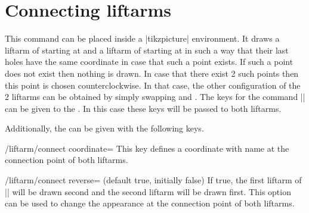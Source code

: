 \documentclass[a4paper,english,dvipsnames]{ltxdoc}
\begin{document}
\section{Connecting liftarms}
\begin{command}{\liftarmconnect{}}
This command can be placed inside a |tikzpicture| environment. It draws a liftarm of  starting at  and a liftarm of  starting at  in such a way that their last holes have the same coordinate in case that such a point exists. If such a point does not exist then nothing is drawn. In case that there exist 2 such points then this point is chosen counterclockwise. In that case, the other configuration of the 2 liftarms can be obtained by simply swapping  and . The keys for the command |\liftarm| can be given to the . In this case these keys will be passed to both liftarms.
\begin{codeexample}[width=9cm]
\end{codeexample}
Additionally, the  can be given with the following keys.
\begin{key}{/liftarm/connect coordinate=}
This key defines a coordinate with name  at the connection point of both liftarms.
\begin{codeexample}[width=10cm]
\end{codeexample}
\end{key}
\begin{key}{/liftarm/connect reverse= (default true, initially false)}
If true, the first liftarm of |\liftarmconnect| will be drawn second and the second liftarm will be drawn first. This option can be used to change the appearance at the connection point of both liftarms.
\begin{codeexample}[width=10cm]

\end{codeexample}
\end{key}
\end{command}
\end{document}
